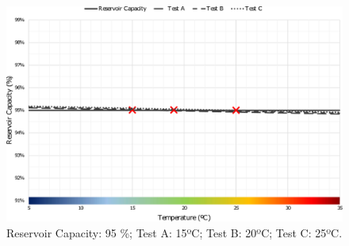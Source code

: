 \begin{figure}[h!]
    \centering
    \includegraphics[scale=0.5]{images/Results/temperature_influence/Analyse_95.pdf}
    \caption{Reservoir Capacity: 95 \%; Test A: 15ºC; Test B: 20ºC; Test C: 25ºC.}
    \label{fig:ana95}
\end{figure}


